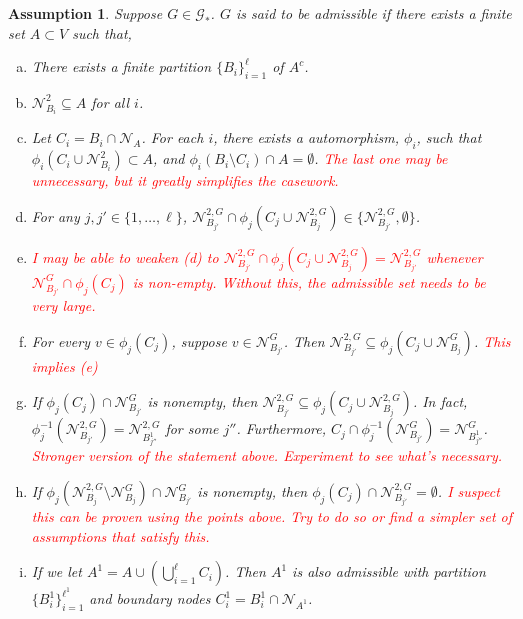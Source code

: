 \documentclass[12pt]{article}
\newcommand{\mc}{\mathcal}
\newcommand{\tr}{\textcolor{red}}
\newcommand{\neigh}[1]{\mc{N}_{#1}}				%
\newcommand{\dneigh}[1]{\mc{N}^2_{#1}}			%
\newcommand{\gneigh}[2]{\mc{N}^{#1}_{#2}}			%
\newcommand{\dgneigh}[2]{\mc{N}^{2,#1}_{#2}}		%
\newcommand{\indx}[1]{^{#1}}						%
\newcommand{\psize}{\ell}							%
\newcommand{\Gs}{\mc{G}_\ast}						%
\newtheorem{assu}{Assumption}
\begin{document}
\begin{assu}
Suppose \(G \in \Gs\). \(G\) is said to be admissible if there exists a finite set \(A \subset V\) such that,

\begin{enumerate}[(a)]
\item There exists a finite partition \(\{B_i\}_{i=1}^\psize\) of \(A^c\).

\item \(\dneigh{B_i} \subseteq A\) for all \(i\).

\item Let \(C_i = B_i\cap\neigh{A}\). For each \(i\), there exists a automorphism, \(\phi_i\), such that \(\phi_i(C_i\cup \dneigh{B_i}) \subset A\), and \(\phi_i(B_i\setminus C_i)\cap A = \emptyset\). \tr{The last one may be unnecessary, but it greatly simplifies the casework.}

\item For any \(j,j' \in \{1,\dots,\psize\}\), \(\dgneigh{G}{B_{j'}}\cap\phi_j(C_j\cup\dgneigh{G}{B_j}) \in \{\dgneigh{G}{B_{j'}},\emptyset\}\). 

\item \tr{I may be able to weaken (d) to \(\dgneigh{G}{B_{j'}}\cap\phi_j(C_j\cup\dgneigh{G}{B_j}) = \dgneigh{G}{B_{j'}}\) whenever \(\gneigh{G}{B_{j'}}\cap\phi_j(C_j)\) is non-empty. Without this, the admissible set needs to be very large.}

\item For every \(v \in \phi_j(C_j)\), suppose \(v \in \gneigh{G}{B_{j'}}\). Then \(\dgneigh{G}{B_{j'}}\subseteq \phi_j(C_j\cup\gneigh{G}{B_j})\). \tr{This implies (e)}

\item If \(\phi_j(C_j) \cap \gneigh{G}{B_{j'}}\) is nonempty, then \(\dgneigh{G}{B_{j'}} \subseteq \phi_j(C_j\cup\dgneigh{G}{B_j})\). In fact, \(\phi_j^{-1}(\dgneigh{G}{B_{j'}}) = \dgneigh{G}{B_{j''}\indx{1}}\) for some \(j''\). Furthermore, \(C_j\cap\phi_j^{-1}(\gneigh{G}{B_{j'}}) = \gneigh{G}{B_{j''}\indx{1}}\). \tr{Stronger version of the statement above. Experiment to see what's necessary.}

\item If \(\phi_j(\dgneigh{G}{B_j}\setminus\gneigh{G}{B_j})\cap\gneigh{G}{B_{j'}}\) is nonempty, then \(\phi_j(C_j)\cap\dgneigh{G}{B_{j'}} = \emptyset\). \tr{I suspect this can be proven using the points above. Try to do so or find a simpler set of assumptions that satisfy this.}

\item If we let \(A\indx{1} = A\cup \left(\bigcup_{i=1}^\psize C_i\right)\). Then \(A\indx{1}\) is also admissible with partition \(\{B\indx{1}_i\}_{i=1}^{\psize\indx{1}}\) and boundary nodes \(C\indx{1}_i = B\indx{1}_i\cap \neigh{A\indx{1}}\).


\end{enumerate}
\end{assu}
\end{document}

